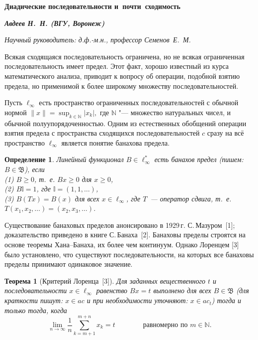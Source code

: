 \documentclass[14pt, a4paper]{extbook}
\newtheorem{theorem}{Теорема}
\newtheorem{definition}{Определение}
\begin{document}
\begin{center}%
\textbf{\large{} Диадические последовательности и~почти~сходимость} %

\textit{\textbf{Авдеев Н.~Н. (ВГУ, Воронеж)}} %

\textit{Научный руководитель: д.ф.-м.н., профессор Семенов~Е.~М.} %
\end{center}


Всякая сходящаяся последовательность ограничена,
но не всякая ограниченная последовательность имеет предел.
Этот факт, хорошо известный из курса математического анализа,
приводит к вопросу об операции, подобной взятию предела,
но применимой к более широкому множеству последовательностей.


Пусть $\ell_\infty$ есть пространство ограниченных последовательностей с обычной нормой
$
	\|x\| = \sup_{k\in\mathbb{N}} |x_k|
	,
$
где $\mathbb{N}$ "--- множество натуральных чисел, и обычной полуупорядоченностью.
Одним из естественных обобщений операции взятия предела с пространства сходящихся последовательностей $c$ сразу на всё пространство $\ell_\infty$
является понятие банахова предела.

\begin{definition}
	Линейный функционал $B\in \ell_\infty^*$ есть банахов предел (пишем: $B \in \mathfrak{B}$),
	если
	\\(1)
		$B\geq0$, т.~е. $Bx \geq 0$ для $x \geq 0$,
	\\(2)
		$B\mathbb{I}=1$, где $\mathbb{I} =(1,1,\ldots)$,
	\\(3)
		$B(Tx)=B(x)$ для всех $x\in \ell_\infty$, где $T$~---
		оператор сдвига, т.~е. $T(x_1,x_2,\ldots)=(x_2,x_3,\ldots)$.
\end{definition}

Существование банаховых пределов анонсировано в 1929\,г. С.\,Мазуром~[1];
доказательство приведено в книге С.\,Банаха~[2].
Банаховы пределы строятся на основе теоремы Хана--Банаха,
их более чем континуум.
Однако Лоренцем [3] было установлено,
что существуют последовательности,
на которых все банаховы пределы принимают одинаковое значение.



\begin{theorem}[{Критерий Лоренца~[3]}]
	Для заданных вещественного $t$ и последовательности $x\in\ell_\infty$ равенство $Bx=t$ выполнено для всех $B\in\mathfrak{B}$
	(для краткости пишут: $x\in ac$ и при необходимости уточняют: $x\in ac_t$)
	тогда и только тогда, когда
	\begin{equation*}
		\label{eq:crit_Lorentz}
		\lim_{n\to\infty} \frac{1}{n} \sum_{k=m+1}^{m+n} x_k = t
		\qquad\qquad\mbox{равномерно по $m\in\mathbb N$.}
	\end{equation*}
\end{theorem}
\end{document}
